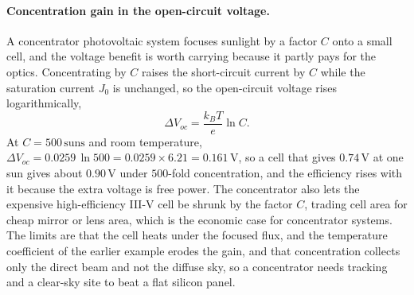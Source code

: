 \paragraph{Concentration gain in the open-circuit voltage.}
A concentrator photovoltaic system focuses sunlight by a factor $C$ onto a
small cell, and the voltage benefit is worth carrying because it partly pays
for the optics. Concentrating by $C$ raises the short-circuit current by $C$
while the saturation current $J_0$ is unchanged, so the open-circuit voltage
rises logarithmically,
\[
\Delta V_{oc} = \frac{k_BT}{e}\ln C.
\]
At $C = 500\,\text{suns}$ and room temperature, $\Delta V_{oc} = 0.0259\,
\ln 500 = 0.0259\times 6.21 = 0.161\,\si{\volt}$, so a cell that gives
$0.74\,\si{\volt}$ at one sun gives about $0.90\,\si{\volt}$ under $500$-fold
concentration, and the efficiency rises with it because the extra voltage is
free power. The concentrator also lets the expensive high-efficiency III-V
cell be shrunk by the factor $C$, trading cell area for cheap mirror or lens
area, which is the economic case for concentrator systems. The limits are
that the cell heats under the focused flux, and the temperature coefficient
of the earlier example erodes the gain, and that concentration collects only
the direct beam and not the diffuse sky, so a concentrator needs tracking
and a clear-sky site to beat a flat silicon panel.

